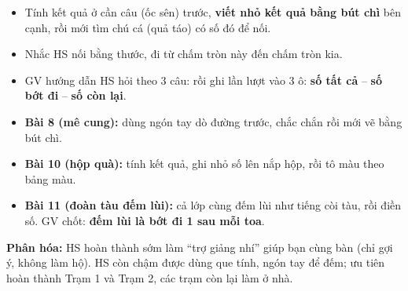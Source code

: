 \documentclass[../main.tex]{subfiles}
\begin{document}
\begin{itemize}
    \item Tính kết quả ở cần câu (ốc sên) trước, \textbf{viết nhỏ kết quả bằng bút chì} bên cạnh, rồi mới tìm chú cá (quả táo) có số đó để nối.
    \item Nhắc HS nối bằng thước, đi từ chấm tròn này đến chấm tròn kia.
\end{itemize}
\GAhinh
{\centering
    \hspace{2cm}
    \par}

\begin{itemize}
    \item GV hướng dẫn HS hỏi theo 3 câu:  rồi ghi lần lượt vào 3 ô: \textbf{số tất cả} -- \textbf{số bớt đi} -- \textbf{số còn lại}.
\end{itemize}
\GAhinh
{\centering{}\par}

\begin{itemize}
    \item \textbf{Bài 8 (mê cung):} dùng ngón tay dò đường trước, chắc chắn rồi mới vẽ bằng bút chì.
    \item \textbf{Bài 10 (hộp quà):} tính kết quả, ghi nhỏ số lên nắp hộp, rồi tô màu theo bảng màu.
    \item \textbf{Bài 11 (đoàn tàu đếm lùi):} cả lớp cùng đếm lùi  như tiếng còi tàu, rồi điền số. GV chốt: \textbf{đếm lùi là bớt đi 1 sau mỗi toa}.
\end{itemize}
\GAhinh
{\centering{}\par}
\begin{luuy}
    \textbf{Phân hóa:} HS hoàn thành sớm làm “trợ giảng nhí” giúp bạn cùng bàn (chỉ gợi ý, không làm hộ). HS còn chậm được dùng que tính, ngón tay để đếm; ưu tiên hoàn thành Trạm 1 và Trạm 2, các trạm còn lại làm ở nhà.
\end{luuy}
\end{document}
